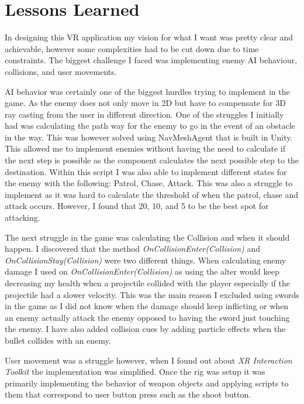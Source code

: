 \documentclass[12pt, twoside]{article}
\begin{document}
\section{Lessons Learned}
In designing this VR application my vision for what I want was pretty clear and
achievable, however some complexities had to be cut down due to time
constraints. The biggest challenge I faced was implementing enemy AI behaviour,
collisions, and user movements. \par 

AI behavior was certainly one of the biggest hurdles trying to implement in the
game. As the enemy does not only move in 2D but have to compensate for 3D ray
casting from the user in different direction. One of the struggles I initially
had was calculating the path way for the enemy to go in the event of an obstacle
in the way. This was however solved using NavMeshAgent that is built in Unity.
This allowed me to implement enemies without having the need to calculate if the
next step is possible as the component calculates the next possible step to the
destination. Within this script I was also able to implement different states
for the enemy with the following: Patrol, Chase, Attack. This was also a
struggle to implement as it was hard to calculate the threshold of when the
patrol, chase and attack occurs. However, I found that 20, 10, and 5 to be the
best spot for attacking.\par

The next struggle in the game was calculating the Collision and when it should
happen. I discovered that the method \emph{OnCollisionEnter(Collision)} and
\emph{OnCollisionStay(Collision)} were two different things. When calculating
enemy damage I used on \emph{OnCollisionEnter(Collision)} as using the alter
would keep decreasing my health when a projectile collided with the player
especially if the projectile had a slower velocity. This was the main reason I
excluded using swords in the game as I did not know when the damage should keep
inflicting or when an enemy actually attack the enemy opposed to having the
sword just touching the enemy. I have also added collision cues by adding
particle effects when the bullet collides with an enemy.\par

User movement was a struggle however, when I found out about \emph{XR
Interaction Toolkit} the implementation was simplified. Once the rig was setup
it was primarily implementing the behavior of weapon objects and applying
scripts to them that correspond to user button press such as the shoot button. 
\end{document}
